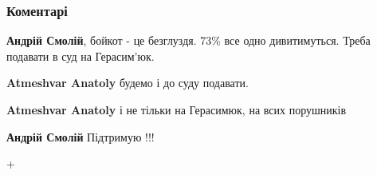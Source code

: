 
 
 
 
 
\subsubsection{Коментарі}

\begin{itemize}
 
\textbf{Андрій Смолій}, бойкот - це безглуздя. 73\% все одно дивитимуться. Треба подавати в суд на Герасим'юк.

\begin{itemize}

 
\textbf{Atmeshvar Anatoly} будемо і до суду подавати.

 
\textbf{Atmeshvar Anatoly} і не тільки на Герасимюк, на всих порушників
 
\textbf{Андрій Смолій} Підтримую !!!

 
+
\end{itemize}


\end{itemize}
